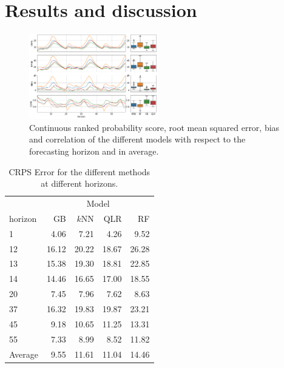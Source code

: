 \documentclass[a4paper,twocolumn,5p]{elsarticle}
\begin{document}

\section{Results and discussion}
\label{sec:results}

\begin{figure}[tbp]
  \centering
  \includegraphics[width=0.5\textwidth]{results/errorGraph}
  \caption{\label{figure:errorGraph}
    Continuous ranked probability score, root mean squared
    error, bias and correlation of the different models with respect to the
    forecasting horizon and in average.%
  }
\end{figure}

\begin{table}[tbp]
  \centering
  \caption{\label{tab:determ}CRPS Error for the different methods at different
    horizons.%
  }
  \begin{tabular}{lrrrr}
    \toprule
    & \multicolumn{4}{c}{Model} \\ \cmidrule{2-5} 
    horizon &    GB &   $k$NN &   QLR &    RF \\
    \midrule
    1     & 4.06 &  7.21 &  4.26 &  9.52 \\
    12    & 16.12 & 20.22 & 18.67 & 26.28 \\
    13    & 15.38 & 19.30 & 18.81 & 22.85 \\
    14    & 14.46 & 16.65 & 17.00 & 18.55 \\
    20    & 7.45 &  7.96 &  7.62 &  8.63 \\
    37    & 16.32 & 19.83 & 19.87 & 23.21 \\
    45    & 9.18 & 10.65 & 11.25 & 13.31 \\
    55    & 7.33 &  8.99 &  8.52 & 11.82 \\
    \midrule
    Average & 9.55 & 11.61 & 11.04 & 14.46 \\
    \bottomrule
  \end{tabular}
\end{table}
\end{document}
